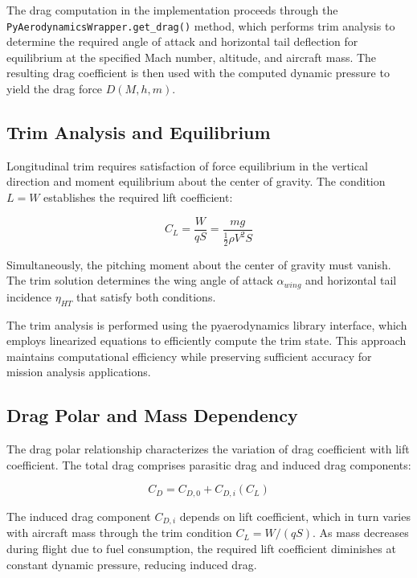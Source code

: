 The drag computation in the implementation proceeds through the \texttt{PyAerodynamicsWrapper.get\_drag()} method, which performs trim analysis to determine the required angle of attack and horizontal tail deflection for equilibrium at the specified Mach number, altitude, and aircraft mass. The resulting drag coefficient is then used with the computed dynamic pressure to yield the drag force $D(M, h, m)$.

\subsection{Trim Analysis and Equilibrium}

Longitudinal trim requires satisfaction of force equilibrium in the vertical direction and moment equilibrium about the center of gravity. The condition $L = W$ establishes the required lift coefficient:

\begin{equation}
C_L = \frac{W}{qS} = \frac{mg}{\frac{1}{2}\rho V^2 S}
\end{equation}

Simultaneously, the pitching moment about the center of gravity must vanish. The trim solution determines the wing angle of attack $\alpha_{wing}$ and horizontal tail incidence $\eta_{HT}$ that satisfy both conditions.

The trim analysis is performed using the pyaerodynamics library interface, which employs linearized equations to efficiently compute the trim state. This approach maintains computational efficiency while preserving sufficient accuracy for mission analysis applications.

\subsection{Drag Polar and Mass Dependency}

The drag polar relationship characterizes the variation of drag coefficient with lift coefficient. The total drag comprises parasitic drag and induced drag components:

\begin{equation}
C_D = C_{D,0} + C_{D,i}(C_L)
\end{equation}

The induced drag component $C_{D,i}$ depends on lift coefficient, which in turn varies with aircraft mass through the trim condition $C_L = W/(qS)$. As mass decreases during flight due to fuel consumption, the required lift coefficient diminishes at constant dynamic pressure, reducing induced drag.

